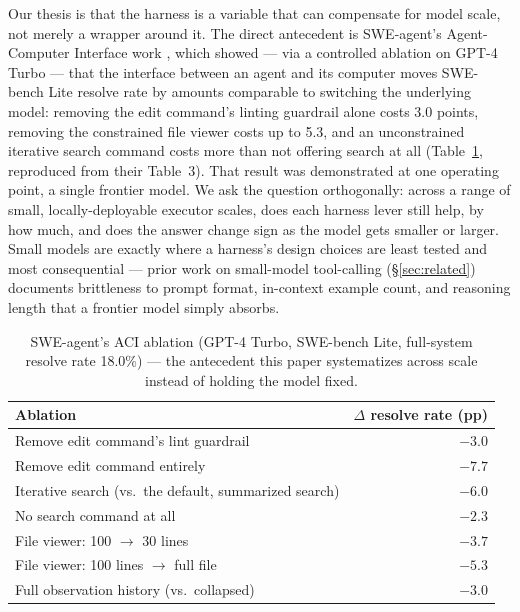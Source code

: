 \documentclass[smallcondensed,natbib]{svjour3}
\begin{document}
Our thesis is that the harness is a variable that can compensate for
model scale, not merely a wrapper around it. The direct antecedent is
SWE-agent's Agent-Computer Interface work \citep{yang2024sweagent},
which showed --- via a controlled ablation on GPT-4 Turbo --- that the
interface between an agent and its computer moves SWE-bench Lite
\citep{jimenez2024swebench} resolve rate by amounts comparable to
switching the underlying model:
removing the edit command's linting guardrail alone costs 3.0 points,
removing the constrained file viewer costs up to 5.3, and an
unconstrained iterative search command costs more than not offering
search at all (Table~\ref{tab:aci}, reproduced from their Table~3). That
result was demonstrated at one operating point, a single frontier
model. We ask the question orthogonally: across a range of small,
locally-deployable executor scales, does each harness lever still help,
by how much, and does the answer change sign as the model gets smaller
or larger. Small models are exactly where a harness's design choices are
least tested and most consequential --- prior work on small-model
tool-calling (\S\ref{sec:related}) documents brittleness to prompt
format, in-context example count, and reasoning length that a frontier
model simply absorbs.

\begin{table}[t]
\centering\small
\caption{SWE-agent's ACI ablation (GPT-4 Turbo, SWE-bench Lite,
full-system resolve rate 18.0\%) \citep{yang2024sweagent} --- the
antecedent this paper systematizes across scale instead of holding the
model fixed.}
\label{tab:aci}
\begin{tabular}{lr}
\toprule
Ablation & $\Delta$ resolve rate (pp) \\
\midrule
Remove edit command's lint guardrail & $-3.0$ \\
Remove edit command entirely & $-7.7$ \\
Iterative search (vs.\ the default, summarized search) & $-6.0$ \\
No search command at all & $-2.3$ \\
File viewer: 100 $\to$ 30 lines & $-3.7$ \\
File viewer: 100 lines $\to$ full file & $-5.3$ \\
Full observation history (vs.\ collapsed) & $-3.0$ \\
\bottomrule
\end{tabular}
\end{table}
\end{document}
